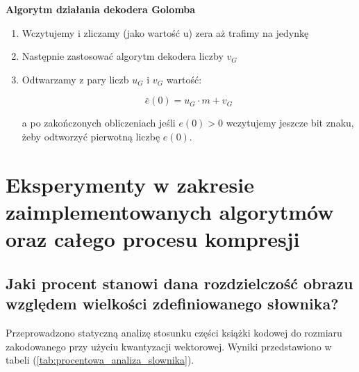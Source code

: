 \documentclass{article}
\begin{document}
\textbf{Algorytm działania dekodera Golomba}

\begin{enumerate}
	\item Wczytujemy i zliczamy (jako wartość u) zera aż trafimy na jedynkę
	\item Następnie zastosować algorytm dekodera liczby $v_G$
	\item Odtwarzamy z pary liczb $u_G$ i $v_G$ wartość:
	
	\begin{equation}
	\bar{e}(0)=u_{G} \cdot m+v_{G}
	\end{equation}
	
	a po zakończonych obliczeniach jeśli $e(0) > 0$ wczytujemy jeszcze bit znaku, żeby odtworzyć pierwotną liczbę $e(0)$.	
	
\end{enumerate}


\section{Eksperymenty w zakresie zaimplementowanych algorytmów oraz całego procesu kompresji}

\subsection{Jaki procent stanowi dana rozdzielczość
  obrazu względem wielkości zdefiniowanego słownika?}
  
 Przeprowadzono statyczną analizę stosunku części książki kodowej do rozmiaru zakodowanego przy użyciu kwantyzacji wektorowej. Wyniki przedstawiono w tabeli (\ref{tab:procentowa_analiza_slownika}).
\end{document}
